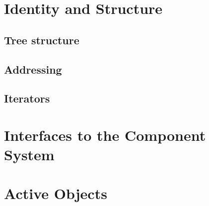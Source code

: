 \documentclass[12pt]{scrartcl}
\begin{document}
\section{Identity and Structure} 


\subsection{Tree structure} 




\subsection{Addressing}





\subsection{Iterators}





\section{Interfaces to the Component System}



\section{Active Objects} 





\end{document}
